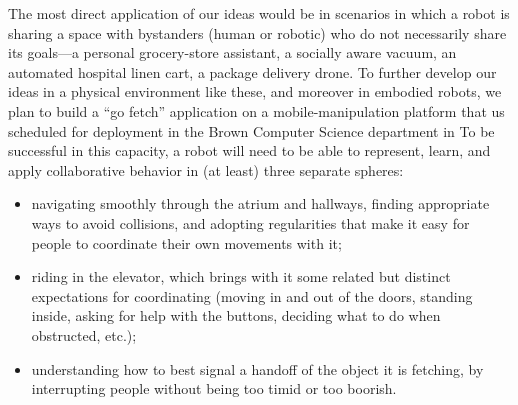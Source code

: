 The most direct application of our ideas would be in scenarios in
which a robot is sharing a space with bystanders (human or robotic)
who do not necessarily share its goals---a personal grocery-store
assistant, a socially aware vacuum, an automated hospital linen cart,
a package delivery drone.  To further develop our ideas in a physical
environment like these, and moreover in embodied robots,
we plan to build a ``go fetch'' application on a mobile-manipulation
platform that us scheduled for deployment in the Brown Computer Science department in 
To be successful in this capacity, a robot will need to be able to
represent, learn, and apply collaborative behavior in (at least) three
separate spheres:

\begin{itemize}
\item navigating smoothly through the atrium and hallways, finding
  appropriate ways to avoid collisions, and adopting regularities that
  make it easy for people to coordinate their own movements with it;

\item riding in the elevator, which brings with it some related but
  distinct expectations for coordinating (moving in and out of the
  doors, standing inside, asking for help with the buttons, deciding
  what to do when obstructed, etc.);

\item understanding how to best signal a handoff of the object it is
  fetching, by interrupting people without being too timid or too
  boorish.
\end{itemize}


